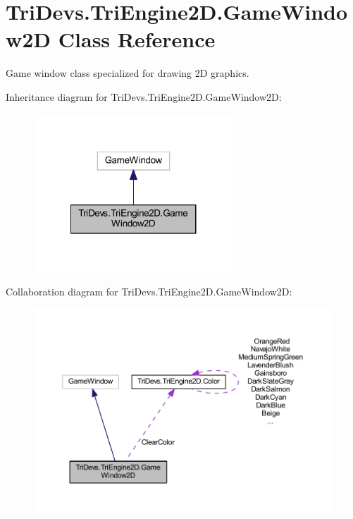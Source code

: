 \hypertarget{class_tri_devs_1_1_tri_engine2_d_1_1_game_window2_d}{\section{Tri\-Devs.\-Tri\-Engine2\-D.\-Game\-Window2\-D Class Reference}
\label{class_tri_devs_1_1_tri_engine2_d_1_1_game_window2_d}
}


Game window class specialized for drawing 2\-D graphics.  




Inheritance diagram for Tri\-Devs.\-Tri\-Engine2\-D.\-Game\-Window2\-D\-:
\nopagebreak
\begin{figure}[H]
\begin{center}
\leavevmode
\includegraphics[width=212pt]{class_tri_devs_1_1_tri_engine2_d_1_1_game_window2_d__inherit__graph}
\end{center}
\end{figure}


Collaboration diagram for Tri\-Devs.\-Tri\-Engine2\-D.\-Game\-Window2\-D\-:
\nopagebreak
\begin{figure}[H]
\begin{center}
\leavevmode
\includegraphics[width=350pt]{class_tri_devs_1_1_tri_engine2_d_1_1_game_window2_d__coll__graph}
\end{center}
\end{figure}
